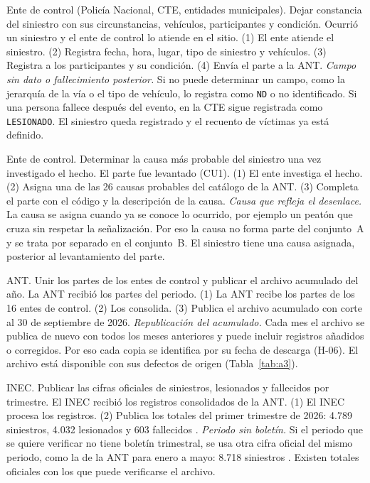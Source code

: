 {Ente de control (Policía Nacional, CTE, entidades municipales).}
{Dejar constancia del siniestro con sus circunstancias, vehículos, participantes y condición.}
{Ocurrió un siniestro y el ente de control lo atiende en el sitio.}
{(1) El ente atiende el siniestro. (2) Registra fecha, hora, lugar, tipo de siniestro y vehículos. (3) Registra a los participantes y su condición. (4) Envía el parte a la ANT.}
{\emph{Campo sin dato o fallecimiento posterior.} Si no puede determinar un campo, como la jerarquía de la vía o el tipo de vehículo, lo registra como \texttt{ND} o no identificado. Si una persona fallece después del evento, en la CTE sigue registrada como \texttt{LESIONADO}.}
{El siniestro queda registrado y el recuento de víctimas ya está definido.}

{Ente de control.}
{Determinar la causa más probable del siniestro una vez investigado el hecho.}
{El parte fue levantado (CU1).}
{(1) El ente investiga el hecho. (2) Asigna una de las 26 causas probables del catálogo de la ANT. (3) Completa el parte con el código y la descripción de la causa.}
{\emph{Causa que refleja el desenlace.} La causa se asigna cuando ya se conoce lo ocurrido, por ejemplo un peatón que cruza sin respetar la señalización. Por eso la causa no forma parte del conjunto~A y se trata por separado en el conjunto~B.}
{El siniestro tiene una causa asignada, posterior al levantamiento del parte.}

{ANT.}
{Unir los partes de los entes de control y publicar el archivo acumulado del año.}
{La ANT recibió los partes del periodo.}
{(1) La ANT recibe los partes de los 16 entes de control. (2) Los consolida. (3) Publica el archivo acumulado con corte al 30 de septiembre de 2026.}
{\emph{Republicación del acumulado.} Cada mes el archivo se publica de nuevo con todos los meses anteriores y puede incluir registros añadidos o corregidos. Por eso cada copia se identifica por su fecha de descarga (H-06).}
{El archivo está disponible con sus defectos de origen (Tabla~\ref{tab:a3}).}

{INEC.}
{Publicar las cifras oficiales de siniestros, lesionados y fallecidos por trimestre.}
{El INEC recibió los registros consolidados de la ANT.}
{(1) El INEC procesa los registros. (2) Publica los totales del primer trimestre de 2026: 4.789 siniestros, 4.032 lesionados y 603 fallecidos \cite{ref1}.}
{\emph{Periodo sin boletín.} Si el periodo que se quiere verificar no tiene boletín trimestral, se usa otra cifra oficial del mismo periodo, como la de la ANT para enero a mayo: 8.718 siniestros \cite{ref7}.}
{Existen totales oficiales con los que puede verificarse el archivo.}

